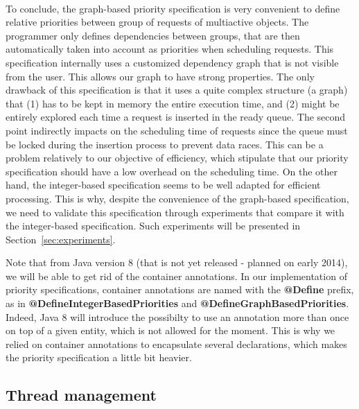 \documentclass[11pt]{report}
\begin{document}
\paragraph{}
To conclude, the graph-based priority specification is very convenient to define relative priorities between group of requests of multiactive objects. The programmer only defines dependencies between groups, that are then automatically taken into account as priorities when scheduling requests. This specification internally uses a customized dependency graph that is not visible from the user. This allows our graph to have strong properties. The only drawback of this specification is that it uses a quite complex structure (a graph) that (1) has to be kept in memory the entire execution time, and (2) might be entirely explored each time a request is inserted in the ready queue. The second point indirectly impacts on the scheduling time of requests since the queue must be locked during the insertion process to prevent data races. This can be a problem relatively to our objective of efficiency, which stipulate that our priority specification should have a low overhead on the scheduling time. On the other hand, the integer-based specification seems to be well adapted for efficient processing. This is why, despite the convenience of the graph-based specification, we need to validate this specification through experiments that compare it with the integer-based specification. Such experiments will be presented in Section~\ref{sec:experiments}.

Note that from Java version 8 (that is not yet released - planned on early 2014), we will be able to get rid of the container annotations. In our implementation of priority specifications, container annotations are named with the \textbf{@Define} prefix, as in \textbf{@DefineIntegerBasedPriorities} and \textbf{@DefineGraphBasedPriorities}. Indeed, Java 8 will introduce the possibilty to use an annotation more than once on top of a given entity, which is not allowed for the moment. This is why we relied on container annotations to encapsulate several declarations, which makes the priority specification a little bit heavier.

\subsection{Thread management}
\end{document}
